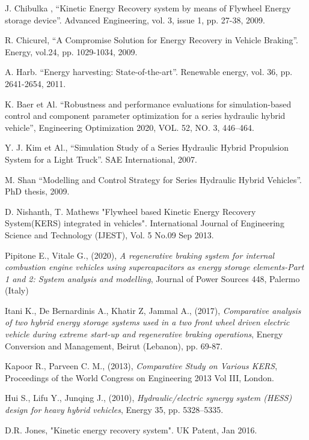 \documentclass[11pt]{article}
\begin{document}
\begin{thebibliography}{60}
	
	
	
	
	
	J. Chibulka , “Kinetic Energy Recovery system by means of Flywheel Energy 		    storage device”. 
	Advanced Engineering, vol. 3, issue 1, pp. 27-38, 2009.
	
	R. Chicurel, “A Compromise Solution for Energy Recovery in Vehicle Braking”.      	Energy, vol.24, pp. 1029-1034, 2009.
	
	A. Harb. “Energy harvesting: State-of-the-art”. 
	Renewable energy, vol. 36, pp. 2641-2654, 2011.
	
	K. Baer et Al. “Robustness and performance evaluations for simulation-based 		control and component parameter optimization for a series hydraulic hybrid 			vehicle”,  Engineering Optimization 2020, VOL. 52, NO. 3, 446–464.	
	
	Y. J. Kim et Al., “Simulation Study of a Series Hydraulic Hybrid Propulsion 		System for a Light Truck”. SAE International, 2007.
	
	M. Shan “Modelling and Control Strategy for Series Hydraulic Hybrid 				Vehicles”.  PhD thesis, 2009.
	
	D. Nishanth, T. Mathews "Flywheel based Kinetic Energy Recovery System(KERS) 	    integrated in vehicles". International Journal of Engineering Science and      	Technology (IJEST), Vol. 5 No.09 Sep 2013.
	
	Pipitone E., Vitale G., (2020), \textit{A regenerative braking system for internal combustion engine vehicles using supercapacitors as energy storage elements-Part 1 and 2: System analysis and modelling}, Journal of Power Sources 448, Palermo (Italy)     	
	
	Itani K., De Bernardinis A., Khatir Z, Jammal A., (2017),  \textit{Comparative analysis of two hybrid energy storage systems used in a two front wheel driven electric vehicle during extreme start-up and regenerative braking operations},  Energy Conversion and Management, Beirut (Lebanon), pp. 69-87.
	
	Kapoor R., Parveen C. M., (2013), \textit{Comparative Study on Various KERS},   	Proceedings of the World Congress on Engineering 2013 Vol III, London.
	
	Hui S., Lifu Y., Junqing J., (2010), \textit{Hydraulic/electric synergy   	 	    system (HESS) design for heavy hybrid vehicles}, Energy 35, pp. 5328--5335.
	
	D.R. Jones, "Kinetic energy recovery system".
	UK Patent, Jan 2016.  
	
	
\end{thebibliography}
\end{document}

